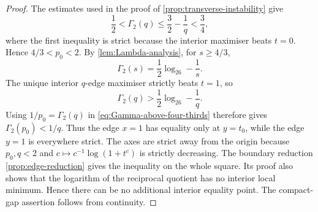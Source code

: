 \documentclass[11pt,reqno]{amsart}
\numberwithin{equation}{section}
\theoremstyle{definition}
\theoremstyle{remark}
\newcommand{\logtwo}{\log_2}
\begin{document}
\begin{proof}
The estimates used in the proof of \cref{prop:transverse-instability} give
\[
  \frac12<\Gamma_2(q)\le\frac32-\frac1q<\frac34,
\]
where the first inequality is strict because the interior maximiser beats
$t=0$.  Hence $4/3<p_0<2$.  By \cref{lem:Lambda-analysis}, for $s\ge4/3$,
\begin{equation}\label{eq:Gamma-above-four-thirds}
  \Gamma_2(s)=\frac12\logtwo6-\frac1s.
\end{equation}
The unique interior $q$-edge maximiser strictly beats $t=1$, so
\[
  \Gamma_2(q)>\frac12\logtwo6-\frac1q.
\]
Using $1/p_0=\Gamma_2(q)$ in
\eqref{eq:Gamma-above-four-thirds} therefore gives
$\Gamma_2(p_0)<1/q$.  Thus the edge $x=1$ has equality only at $y=t_0$,
while the edge $y=1$ is everywhere strict.  The axes are strict away from the
origin because $p_0,q<2$ and $c\mapsto c^{-1}\log(1+t^c)$ is strictly
decreasing.  The boundary reduction \cref{prop:edge-reduction} gives the
inequality on the whole square.  Its proof also shows that the logarithm of
the reciprocal quotient has no interior local minimum.  Hence there can be no
additional interior equality point.  The compact-gap assertion follows from
continuity.
\end{proof}
\end{document}
